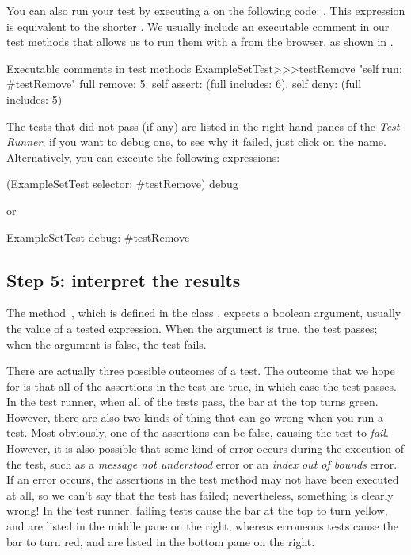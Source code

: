 \documentclass[a4paper,10pt,twoside]{book}
\begin{document}


You can also run your test by executing a  on the following code: .  This expression is equivalent to the shorter
.  
 We usually include an
executable comment in our test methods that allows us to run them
with a  from the browser, as shown in .

\begin{method}[ExampleSetTestTestRemoveii]{Executable comments in test methods}
ExampleSetTest>>>testRemove
	"self run: #testRemove"
	full remove: 5.
	self assert: (full includes: 6).
	self deny: (full includes: 5)
\end{method}


The tests that did not pass (if any) are listed in the right-hand panes of
the \emph{Test Runner};
if you want to debug one, to see why it failed, just click on the name.
Alternatively, you can execute the following expressions:
\begin{code}{}
(ExampleSetTest selector: #testRemove) debug
\end{code}
or
\begin{code}{}
ExampleSetTest debug: #testRemove
\end{code}

\subsection{Step 5: interpret the results}

The method \,, which is defined in the class
, expects a boolean argument, usually the value of a tested expression.  When the argument is
true, the
test passes; when the argument is false, the test fails.

There are actually three possible outcomes of a test.
The outcome that we hope for is that all of the assertions in the test are true, in which case the test passes.
In the test runner, when all of the tests pass, the bar at the top turns green.
However, there are also two kinds of thing that can go wrong when
you run a test.
Most obviously, one of the assertions can be false, causing the test to \emph{fail}.
However, it is also possible that some kind of error occurs during the execution of the test, such as a \emph{message not understood} error or an \emph{index out of bounds} error.
If an error occurs, the assertions in the test method may not have been executed at all,
so we can't say that the test has failed; nevertheless, something is clearly wrong!
In the {test runner}, failing tests cause the bar at the top to turn yellow, and are listed in the middle pane on the right, whereas erroneous tests cause the bar to turn red, and are listed in the bottom pane on the right.
\end{document}
